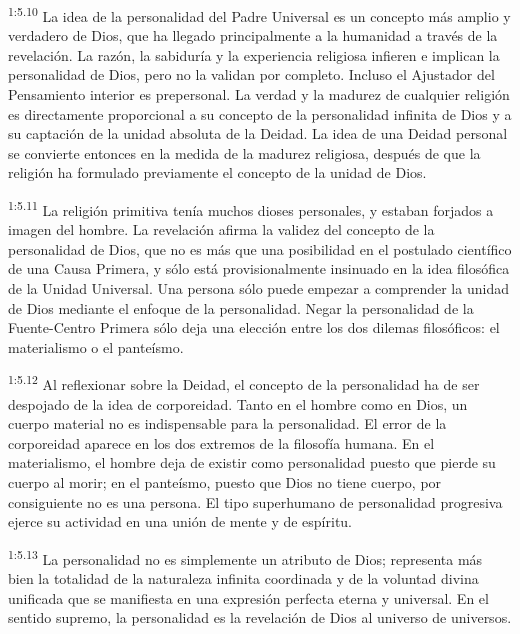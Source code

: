 \par
\textsuperscript{1:5.10} La idea de la personalidad del Padre Universal es un concepto más amplio y verdadero de Dios, que ha llegado principalmente a la humanidad a través de la revelación. La razón, la sabiduría y la experiencia religiosa infieren e implican la personalidad de Dios, pero no la validan por completo. Incluso el Ajustador del Pensamiento interior es prepersonal. La verdad y la madurez de cualquier religión es directamente proporcional a su concepto de la personalidad infinita de Dios y a su captación de la unidad absoluta de la Deidad. La idea de una Deidad personal se convierte entonces en la medida de la madurez religiosa, después de que la religión ha formulado previamente el concepto de la unidad de Dios.

\par
\textsuperscript{1:5.11} La religión primitiva tenía muchos dioses personales, y estaban forjados a imagen del hombre. La revelación afirma la validez del concepto de la personalidad de Dios, que no es más que una posibilidad en el postulado científico de una Causa Primera, y sólo está provisionalmente insinuado en la idea filosófica de la Unidad Universal. Una persona sólo puede empezar a comprender la unidad de Dios mediante el enfoque de la personalidad. Negar la personalidad de la Fuente-Centro Primera sólo deja una elección entre los dos dilemas filosóficos: el materialismo o el panteísmo.

\par
\textsuperscript{1:5.12} Al reflexionar sobre la Deidad, el concepto de la personalidad ha de ser despojado de la idea de corporeidad. Tanto en el hombre como en Dios, un cuerpo material no es indispensable para la personalidad. El error de la corporeidad aparece en los dos extremos de la filosofía humana. En el materialismo, el hombre deja de existir como personalidad puesto que pierde su cuerpo al morir; en el panteísmo, puesto que Dios no tiene cuerpo, por consiguiente no es una persona. El tipo superhumano de personalidad progresiva ejerce su actividad en una unión de mente y de espíritu.

\par
\textsuperscript{1:5.13} La personalidad no es simplemente un atributo de Dios; representa más bien la totalidad de la naturaleza infinita coordinada y de la voluntad divina unificada que se manifiesta en una expresión perfecta eterna y universal. En el sentido supremo, la personalidad es la revelación de Dios al universo de universos.

